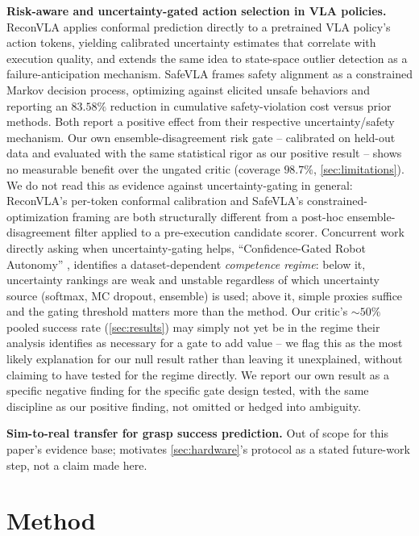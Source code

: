 \documentclass[journal]{IEEEtran}
\begin{document}
\textbf{Risk-aware and uncertainty-gated action selection in VLA
policies.} ReconVLA \cite{chen2026reconvla} applies conformal prediction
directly to a pretrained VLA policy's action tokens, yielding calibrated
uncertainty estimates that correlate with execution quality, and extends
the same idea to state-space outlier detection as a failure-anticipation
mechanism. SafeVLA \cite{zhang2025safevla} frames safety alignment as a
constrained Markov decision process, optimizing against elicited unsafe
behaviors and reporting an $83.58\%$ reduction in cumulative
safety-violation cost versus prior methods. Both report a positive effect
from their respective uncertainty/safety mechanism. Our own
ensemble-disagreement risk gate -- calibrated on held-out data and
evaluated with the same statistical rigor as our positive result -- shows
no measurable benefit over the ungated critic (coverage $98.7\%$,
\cref{sec:limitations}). We do not read this as evidence against
uncertainty-gating in general: ReconVLA's per-token conformal calibration
and SafeVLA's constrained-optimization framing are both structurally
different from a post-hoc ensemble-disagreement filter applied to a
pre-execution candidate scorer. Concurrent work directly asking when
uncertainty-gating helps, ``Confidence-Gated Robot Autonomy''
\cite{gaus2026confidencegated}, identifies a dataset-dependent
\emph{competence regime}: below it, uncertainty rankings are weak and
unstable regardless of which uncertainty source (softmax, MC dropout,
ensemble) is used; above it, simple proxies suffice and the gating
threshold matters more than the method. Our critic's $\sim\!50\%$ pooled
success rate (\cref{sec:results}) may simply not yet be in the regime their
analysis identifies as necessary for a gate to add value -- we flag this as
the most likely explanation for our null result rather than leaving it
unexplained, without claiming to have tested for the regime directly. We
report our own result as a specific negative finding for the specific gate
design tested, with the same discipline as our positive finding, not
omitted or hedged into ambiguity.

\textbf{Sim-to-real transfer for grasp success prediction.} Out of scope
for this paper's evidence base; motivates \cref{sec:hardware}'s protocol as
a stated future-work step, not a claim made here.

\section{Method}
\label{sec:method}
\end{document}
